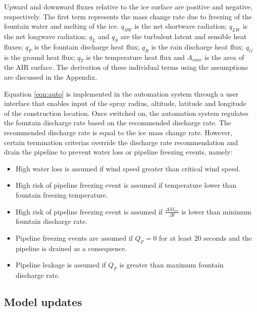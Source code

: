 \documentclass[tc, manuscript]{copernicus}
\begin{document}
Upward and downward fluxes relative to the ice surface are positive and negative, respectively. The first term
represents the mass change rate due to freezing of the fountain water and melting of the ice. $q_{SW}$ is the
net shortwave radiation; $q_{LW}$ is the net longwave radiation; $q_{L}$ and $q_{S}$ are the turbulent latent
and sensible heat fluxes; $q_{F}$ is the fountain discharge heat flux; $q_{R}$ is the rain discharge heat
flux; $q_{G}$ is the ground heat flux; $q_{T}$ is the temperature heat flux and $A_{cone}$ is the area of the
AIR surface. The derivation of these individual terms using the assumptions are discussed in the Appendix.

Equation \ref{eqn:auto} is implemented in the automation system through a user interface that enables input of
the spray radius, altitude, latitude and longitude of the construction location. Once switched on, the
automation system regulates the fountain discharge rate based on the recommended discharge rate. The recommended
discharge rate is equal to the ice mass change rate. However, certain termination criterias override the
discharge rate recommendation and drain the pipeline to prevent water loss or pipeline freezing events, namely: 

\begin{itemize}

\item High water loss is assumed if wind speed greater than critical wind speed.

\item High risk of pipeline freezing event is assumed if temperature lower than fountain freezing temperature.

\item High risk of pipeline freezing event is assumed if $\frac{\Delta M_{ice}}{\Delta t}$ is lower than minimum fountain discharge rate. 

\item Pipeline freezing events are assumed if $Q_F = 0$ for at least 20 seconds and the pipeline is drained as a
  consequence.

\item Pipeline leakage is assumed if $Q_F$ is greater than maximum fountain discharge rate.

\end{itemize}

\subsection{Model updates}
\end{document}
